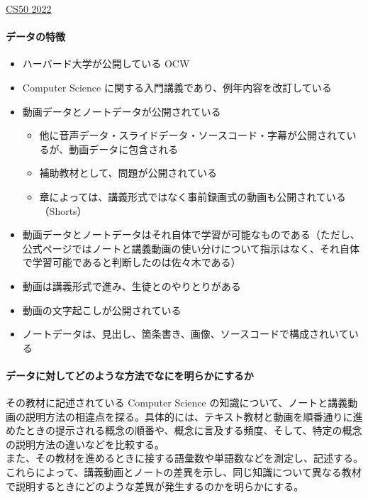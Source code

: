 \href{https://cs50.harvard.edu/x/2022/}{CS50 2022}

\hypertarget{ux30c7ux30fcux30bfux306eux7279ux5fb4-6}{%
\paragraph{データの特徴}\label{ux30c7ux30fcux30bfux306eux7279ux5fb4-6}}

\begin{itemize}
\tightlist
\item
  ハーバード大学が公開している OCW
\item
  Computer Science に関する入門講義であり、例年内容を改訂している
\item
  動画データとノートデータが公開されている

  \begin{itemize}
  \tightlist
  \item
    他に音声データ・スライドデータ・ソースコード・字幕が公開されているが、動画データに包含される
  \item
    補助教材として、問題が公開されている
  \item
    章によっては、講義形式ではなく事前録画式の動画も公開されている（Shorts）
  \end{itemize}
\item
  動画データとノートデータはそれ自体で学習が可能なものである（ただし、公式ページではノートと講義動画の使い分けについて指示はなく、それ自体で学習可能であると判断したのは佐々木である）
\item
  動画は講義形式で進み、生徒とのやりとりがある
\item
  動画の文字起こしが公開されている
\item
  ノートデータは、見出し、箇条書き、画像、ソースコードで構成されいている
\end{itemize}

\hypertarget{ux30c7ux30fcux30bfux306bux5bfeux3057ux3066ux3069ux306eux3088ux3046ux306aux65b9ux6cd5ux3067ux306aux306bux3092ux660eux3089ux304bux306bux3059ux308bux304b-6}{%
\paragraph{データに対してどのような方法でなにを明らかにするか}\label{ux30c7ux30fcux30bfux306bux5bfeux3057ux3066ux3069ux306eux3088ux3046ux306aux65b9ux6cd5ux3067ux306aux306bux3092ux660eux3089ux304bux306bux3059ux308bux304b-6}}

その教材に記述されている Computer Science
の知識について、ノートと講義動画の説明方法の相違点を探る。具体的には、テキスト教材と動画を順番通りに進めたときの提示される概念の順番や、概念に言及する頻度、そして、特定の概念の説明方法の違いなどを比較する。\\
また、その教材を進めるときに接する語彙数や単語数などを測定し、記述する。\\
これらによって、講義動画とノートの差異を示し、同じ知識について異なる教材で説明するときにどのような差異が発生するのかを明らかにする。

